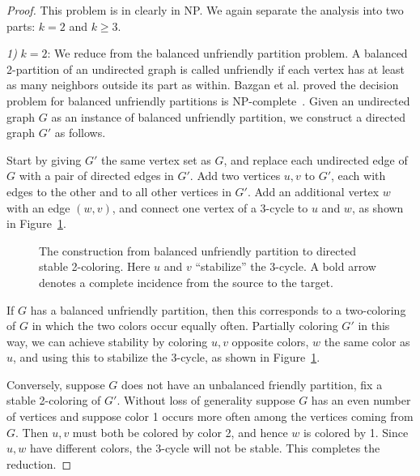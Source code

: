\documentclass{llncs}
\begin{document}
\begin{proof}
This problem is in clearly in NP.  We again separate the analysis into two
parts: $k=2$ and $k \geq 3$. 

\noindent \emph{1)} $k=2$:
We reduce from the balanced unfriendly partition problem. A
balanced 2-partition of an undirected graph is called unfriendly 
if each vertex has at least as many neighbors outside its part as within. 
Bazgan et al. proved the decision problem for balanced unfriendly partitions 
is NP-complete~\cite{BazganTV10}. Given an undirected graph $G$ as an instance of
balanced unfriendly partition, we construct a directed graph $G'$ as follows.

Start by giving $G'$ the same vertex set as $G$, and replace each undirected
edge of $G$ with a pair of directed edges in $G'$. Add two vertices $u,v$ to
$G'$, each with edges to the other and to all other vertices in $G'$. Add an
additional vertex $w$ with an edge $(w,v)$, and connect one vertex of a 3-cycle
to $u$ and $w$, as shown in Figure~\ref{fig:weaktwocolornphard}.

\begin{figure}[htb]
\centering
{}
\caption{The construction from balanced unfriendly partition to directed stable 2-coloring. Here $u$ and $v$ ``stabilize'' the 3-cycle. A bold arrow denotes a complete incidence from the source to the target.}
\label{fig:weaktwocolornphard}
\end{figure}

If $G$ has a balanced unfriendly partition, then this corresponds to a
two-coloring of $G$ in which the two colors occur equally often. Partially
coloring $G'$ in this way, we can achieve stability by coloring $u,v$ opposite
colors, $w$ the same color as $u$, and using this to stabilize the 3-cycle,
as shown in Figure~\ref{fig:weaktwocolornphard}.

Conversely, suppose $G$ does not have an unbalanced friendly partition, fix a
stable 2-coloring of $G'$. Without loss of generality suppose $G$ has an even
number of vertices and suppose color 1 occurs more often among the vertices
coming from $G$. Then $u,v$ must both be colored by color 2, and hence $w$ is
colored by 1. Since $u,w$ have different colors, the 3-cycle will not be
stable. This completes the reduction.


\end{proof}
\end{document}
